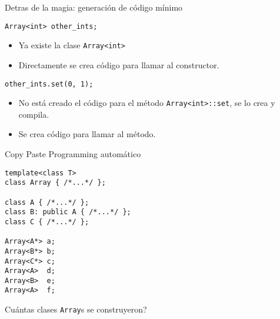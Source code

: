 \begin{frame}[fragile]{Detras de la magia: generaci\'on de c\'odigo m\'inimo}
   \begin{lstlisting}[style=normal,firstnumber=4]
Array<int> other_ints;
   \end{lstlisting}
   \begin{itemize}
      \item Ya existe la \alert{clase} \lstinline[style=normal]!Array<int>!
      \item Directamente se crea c\'odigo para llamar al constructor.
   \end{itemize}
   \begin{lstlisting}[style=normal,firstnumber=5]
other_ints.set(0, 1);
   \end{lstlisting}
   \begin{itemize}
      \item No est\'a creado el c\'odigo para el m\'etodo \lstinline[style=normal]!Array<int>::set!, se lo crea y compila.
      \item Se crea c\'odigo para llamar al m\'etodo.
   \end{itemize}
\end{frame}


\begin{frame}[fragile]{Copy Paste Programming autom\'atico}
   \begin{lstlisting}[style=normal]
template<class T>
class Array { /*...*/ };

class A { /*...*/ };
class B: public A { /*...*/ };
class C { /*...*/ };

Array<A*> a;
Array<B*> b;
Array<C*> c;
Array<A>  d;
Array<B>  e;
Array<A>  f;
   \end{lstlisting}
Cu\'antas clases \lstinline[style=normal]!Array!s se construyeron?
\end{frame}


